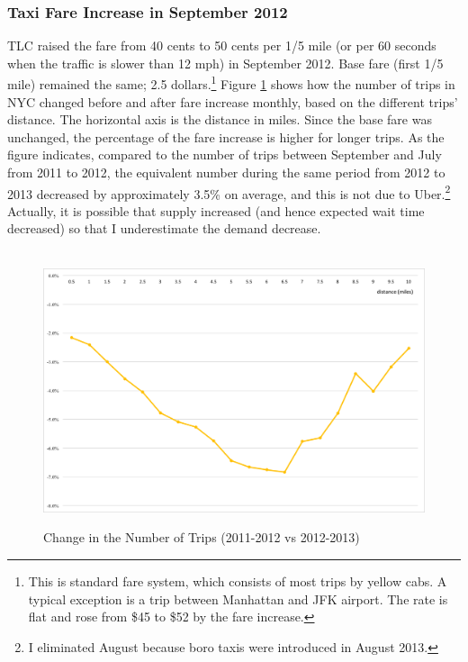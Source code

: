 \vspace{0.5cm}
\subsubsection{Taxi Fare Increase in September 2012}
\hspace{0.5cm} TLC raised the fare from 40 cents to 50 cents per 1/5 mile (or per 60 seconds when the traffic is slower than 12 mph) in September 2012. Base fare (first 1/5 mile) remained the same; 2.5 dollars.\footnote{This is standard fare system, which consists of most trips by yellow cabs. A typical exception is a trip between Manhattan and JFK airport. The rate is flat and rose from \$45 to \$52 by the fare increase.} Figure \ref{fig:Change_trips} shows how the number of trips in NYC changed before and after fare increase monthly, based on the different trips' distance. The horizontal axis is the distance in miles. Since the base fare was unchanged, the percentage of the fare increase is higher for longer trips. As the figure indicates, compared to the number of trips between September and July from 2011 to 2012, the equivalent number during the same period from 2012 to 2013 decreased by approximately 3.5\% on average, and this is not due to Uber.\footnote{I eliminated August because boro taxis were introduced in August 2013.} Actually, it is possible that supply increased (and hence expected wait time decreased) so that I underestimate the demand decrease.


\begin{figure}[h]
\centering
\caption{Change in the Number of Trips (2011-2012 vs 2012-2013)}\label{fig:Change_trips}\\
\vspace{0.2cm}
\includegraphics[width=12cm]{Figures/Change_trips.png}
\end{figure}

